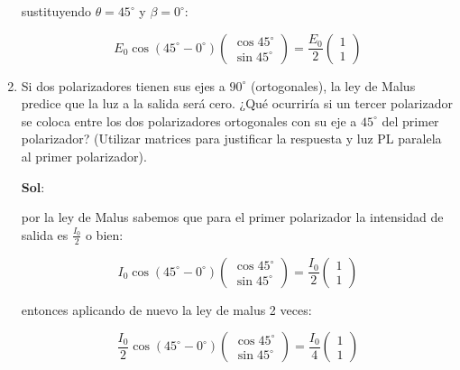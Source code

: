 \documentclass[12pt,a4paper]{article}
\begin{document}
\begin{enumerate}
sustituyendo $\theta= 45^{\circ}$ y $\beta = 0^{\circ}$:

\begin{equation*}
    E_{0} \cos{(45^{\circ} - 0 ^{\circ})}\left(\begin{array}{c}
         \cos{45^{\circ}}  \\
         \sin{45^{\circ}}
    \end{array}\right)=\frac{E_0}{2} \left(\begin{array}{c}
         1  \\
          1
    \end{array}\right)
\end{equation*}








\item Si dos polarizadores tienen sus ejes a $90^{\circ}$ (ortogonales), la ley de Malus predice que la luz a la salida será cero. ¿Qué ocurriría si un tercer polarizador se coloca entre los dos polarizadores ortogonales con su eje a $45^{\circ}$ del primer polarizador? (Utilizar matrices para justificar la respuesta y luz PL paralela al primer polarizador).

\textbf{Sol}:

por la ley de Malus sabemos que para el primer polarizador la intensidad de salida es $\frac{I_0}{2}$ o bien: 

\begin{equation*}
    I_{0} \cos{(45^{\circ} - 0 ^{\circ})}\left(\begin{array}{c}
         \cos{45^{\circ}}  \\
         \sin{45^{\circ}}
    \end{array}\right)=\frac{I_0}{2} \left(\begin{array}{c}
         1  \\
          1
    \end{array}\right)
\end{equation*}

entonces aplicando de nuevo la ley de malus 2 veces:

\begin{equation*}
    \frac{I_{0}}{2} \cos{(45^{\circ} - 0 ^{\circ})}\left(\begin{array}{c}
         \cos{45^{\circ}}  \\
         \sin{45^{\circ}}
    \end{array}\right)=\frac{I_0}{4} \left(\begin{array}{c}
         1  \\
          1
    \end{array}\right)
\end{equation*}



\end{enumerate}
\end{document}
